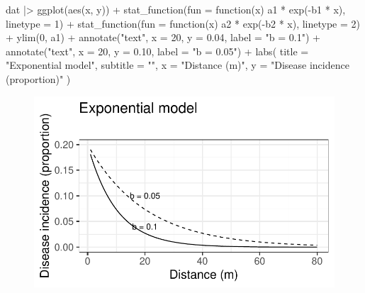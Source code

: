\documentclass[
  letterpaper,
  DIV=11,
  numbers=noendperiod]{scrreprt}
\newenvironment{Shaded}{\begin{snugshade}}{\end{snugshade}}
\newcommand{\AttributeTok}[1]{\textcolor[rgb]{0.40,0.45,0.13}{#1}}
\newcommand{\ControlFlowTok}[1]{\textcolor[rgb]{0.00,0.23,0.31}{#1}}
\newcommand{\DecValTok}[1]{\textcolor[rgb]{0.68,0.00,0.00}{#1}}
\newcommand{\FloatTok}[1]{\textcolor[rgb]{0.68,0.00,0.00}{#1}}
\newcommand{\FunctionTok}[1]{\textcolor[rgb]{0.28,0.35,0.67}{#1}}
\newcommand{\NormalTok}[1]{\textcolor[rgb]{0.00,0.23,0.31}{#1}}
\newcommand{\SpecialCharTok}[1]{\textcolor[rgb]{0.37,0.37,0.37}{#1}}
\newcommand{\StringTok}[1]{\textcolor[rgb]{0.13,0.47,0.30}{#1}}
\begin{document}
\begin{Shaded}
\begin{Highlighting}[]
\NormalTok{dat }\SpecialCharTok{|\textgreater{}}
  \FunctionTok{ggplot}\NormalTok{(}\FunctionTok{aes}\NormalTok{(x, y)) }\SpecialCharTok{+}
  \FunctionTok{stat\_function}\NormalTok{(}\AttributeTok{fun =} \ControlFlowTok{function}\NormalTok{(x) a1 }\SpecialCharTok{*} \FunctionTok{exp}\NormalTok{(}\SpecialCharTok{{-}}\NormalTok{b1 }\SpecialCharTok{*}\NormalTok{ x), }\AttributeTok{linetype =} \DecValTok{1}\NormalTok{) }\SpecialCharTok{+}
  \FunctionTok{stat\_function}\NormalTok{(}\AttributeTok{fun =} \ControlFlowTok{function}\NormalTok{(x) a2 }\SpecialCharTok{*} \FunctionTok{exp}\NormalTok{(}\SpecialCharTok{{-}}\NormalTok{b2 }\SpecialCharTok{*}\NormalTok{ x), }\AttributeTok{linetype =} \DecValTok{2}\NormalTok{) }\SpecialCharTok{+}
  \FunctionTok{ylim}\NormalTok{(}\DecValTok{0}\NormalTok{, a1) }\SpecialCharTok{+}
  \FunctionTok{annotate}\NormalTok{(}\StringTok{"text"}\NormalTok{, }\AttributeTok{x =} \DecValTok{20}\NormalTok{, }\AttributeTok{y =} \FloatTok{0.04}\NormalTok{, }\AttributeTok{label =} \StringTok{"b = 0.1"}\NormalTok{) }\SpecialCharTok{+}
  \FunctionTok{annotate}\NormalTok{(}\StringTok{"text"}\NormalTok{, }\AttributeTok{x =} \DecValTok{20}\NormalTok{, }\AttributeTok{y =} \FloatTok{0.10}\NormalTok{, }\AttributeTok{label =} \StringTok{"b = 0.05"}\NormalTok{) }\SpecialCharTok{+}
  \FunctionTok{labs}\NormalTok{(}
    \AttributeTok{title =} \StringTok{"Exponential model"}\NormalTok{,}
    \AttributeTok{subtitle =} \StringTok{""}\NormalTok{,}
    \AttributeTok{x =} \StringTok{"Distance (m)"}\NormalTok{,}
    \AttributeTok{y =} \StringTok{"Disease incidence (proportion)"}
\NormalTok{  )}
\end{Highlighting}
\end{Shaded}

\begin{figure}[H]

{\centering \includegraphics{./spatial-models_files/figure-pdf/unnamed-chunk-6-1.pdf}

}

\end{figure}
\end{document}
